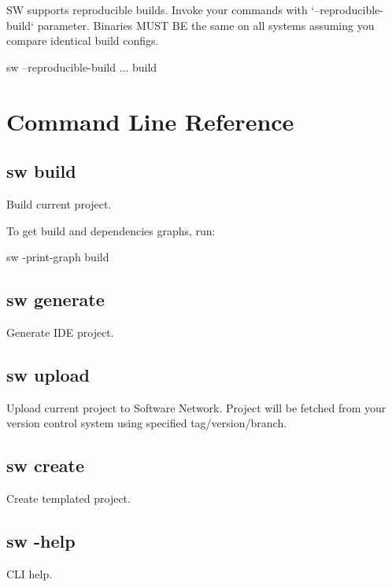 SW supports reproducible builds.
Invoke your commands with `--reproducible-build` parameter.
Binaries MUST BE the same on all systems assuming you compare identical build configs.

\begin{command}
sw --reproducible-build ... build
\end{command}


\section{Command Line Reference}

\subsection{sw build}

Build current project.

To get build and dependencies graphs, run:
\begin{command}
sw -print-graph build
\end{command}

\subsection{sw generate}

Generate IDE project.

\subsection{sw upload}

Upload current project to Software Network.
Project will be fetched from your version control system using specified tag/version/branch.

\subsection{sw create}

Create templated project.

\subsection{sw -help}

CLI help.

